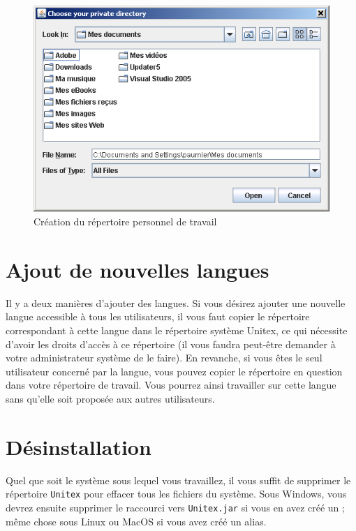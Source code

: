 \begin{figure}[h]
\begin{center}
\includegraphics[width=13cm]{resources/img/fig1-3.png}
\caption{Création du répertoire personnel de travail
\label{fig-creation-personal-directory}}
\end{center}
\end{figure}



\section{Ajout de nouvelles langues}

\bigskip
\noindent Il y a deux manières d’ajouter des langues. Si vous désirez ajouter une nouvelle langue
accessible à tous les utilisateurs, il vous faut copier le répertoire correspondant à cette langue
dans le répertoire système Unitex,
ce qui nécessite d’avoir les droits d’accès à ce répertoire
(il vous faudra peut-être demander à votre administrateur système de le faire).
En revanche, si vous êtes le seul utilisateur concerné par la langue, vous pouvez copier le répertoire
en question dans votre répertoire de travail.
Vous pourrez ainsi travailler sur cette langue sans qu’elle soit proposée aux autres utilisateurs.



\section{Désinstallation}
Quel que soit le système sous lequel vous travaillez, il vous suffit de supprimer le répertoire
\verb+Unitex+ pour effacer tous les fichiers du système. Sous Windows, vous devrez ensuite supprimer
le raccourci vers \verb+Unitex.jar+  si vous en avez créé un ;
même chose sous Linux ou MacOS si vous avez créé un alias.


